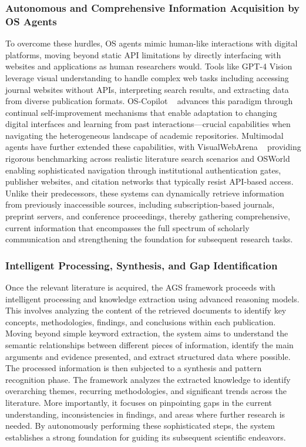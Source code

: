 \subsubsection*{Autonomous and Comprehensive Information Acquisition by OS Agents}

To overcome these hurdles, OS agents mimic human-like interactions with digital platforms, moving beyond static API limitations by directly interfacing with websites and applications as human researchers would. Tools like GPT-4 Vision ~\cite{zheng2024gpt} leverage visual understanding to handle complex web tasks including accessing journal websites without APIs, interpreting search results, and extracting data from diverse publication formats. OS-Copilot ~\cite{wu2024copilot} advances this paradigm through continual self-improvement mechanisms that enable adaptation to changing digital interfaces and learning from past interactions—crucial capabilities when navigating the heterogeneous landscape of academic repositories. Multimodal agents have further extended these capabilities, with VisualWebArena ~\cite{koh2024visualwebarena} providing rigorous benchmarking across realistic literature search scenarios and OSWorld ~\cite{xie2024osworld} enabling sophisticated navigation through institutional authentication gates, publisher websites, and citation networks that typically resist API-based access. Unlike their predecessors, these systems can dynamically retrieve information from previously inaccessible sources, including subscription-based journals, preprint servers, and conference proceedings, thereby gathering comprehensive, current information that encompasses the full spectrum of scholarly communication and strengthening the foundation for subsequent research tasks.

\subsubsection*{Intelligent Processing, Synthesis, and Gap Identification}

Once the relevant literature is acquired, the AGS framework proceeds with intelligent processing and knowledge extraction using advanced reasoning models. This involves analyzing the content of the retrieved documents to identify key concepts, methodologies, findings, and conclusions within each publication. Moving beyond simple keyword extraction, the system aims to understand the semantic relationships between different pieces of information, identify the main arguments and evidence presented, and extract structured data where possible. The processed information is then subjected to a synthesis and pattern recognition phase. The framework analyzes the extracted knowledge to identify overarching themes, recurring methodologies, and significant trends across the literature. More importantly, it focuses on pinpointing gaps in the current understanding, inconsistencies in findings, and areas where further research is needed. By autonomously performing these sophisticated steps, the system establishes a strong foundation for guiding its subsequent scientific endeavors.

